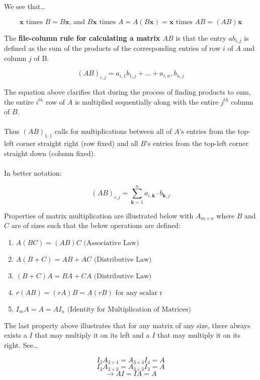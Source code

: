 \documentclass[12pt]{article}
\newcommand{\bt}[1]{\textbf{{#1}}}
\newcommand{\bm}[1]{\mathbf{{#1}}}
\begin{document}
We see that\dots

$$\bm{x} \textrm{ times } B = B\bm{x} \textrm{, and } B\bm{x} \textrm{ times } A = A(B\bm{x}) = \bm{x} \textrm{ times } AB = (AB)\bm{x}$$

The \bt{file-column rule for calculating a matrix $AB$} is that the entry $ab_{i,j}$ is defined as
the sum of the products of the corresponding entries of row $i$ of $A$ and column $j$ of B.

$$(AB)_{i,j} = a_{i,1}b_{1,j} + ... + a_{i,n},b_{n,j}$$

The equation above clarifies that during the process of finding products to sum, the entire $i^{th}$ row of $A$
is multiplied sequentially along with the entire $j^{th}$ column of $B$. \\ \\

Thus $(AB)_{1,1}$ calls for multiplications between all of $A$'s entries from the top-left corner straight right (row fixed)
and all $B$'s entries from the top-left corner straight down (column fixed). \\ \\

In better notation:

$$(AB)_{i,j} = \sum_{\bm{k}=1}^{n}a_{i,\bm{k}}\cdot b_{\bm{k},j}$$

Properties of matrix multiplication are illustrated below with $A_{m\times n}$ where $B$ and $C$ are of sizes
such that the below operations are defined:

\begin{enumerate}
    \item $A(BC) = (AB)C \textrm{ (Associative Law)}$
    \item $A(B + C) = AB + AC \textrm{ (Distributive Law)}$
    \item $(B + C)A = BA + CA \textrm{ (Distributive Law)}$
    \item $r(AB) = (rA)B = A(rB) \textrm{ for any scalar r}$
    \item $I_mA = A = AI_n \textrm{ (Identity for Multiplication of Matrices)}$
\end{enumerate}

The last property above illustrates that for any matrix of any size, there always exists a $I$ that
may multiply it on its left and a $I$ that may multiply it on its right. See\dots

$$I_3A_{3 \times 4} = A_{3 \times 4}I_4 = A$$
$$I_3A_{3 \times 3} = A_{3 \times 3}I_3 = A$$
$$\rightarrow AI = IA = A$$
\end{document}
